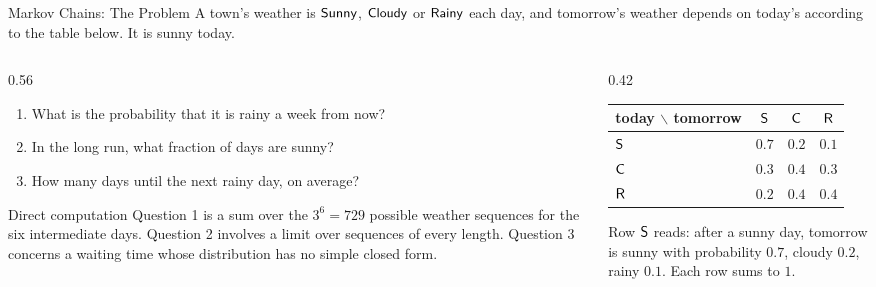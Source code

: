 \begin{frame}{Markov Chains: The Problem}
  \label{fr:mcprob}
  \small
  A town's weather is $\mathsf{Sunny}$, $\mathsf{Cloudy}$ or $\mathsf{Rainy}$ each day, and tomorrow's weather depends on today's according to the table below. It is sunny today.
  \begin{columns}[T]
    \begin{column}{0.56\textwidth}
      \begin{enumerate}
        \item What is the probability that it is rainy a week from now?
        \item In the long run, what fraction of days are sunny?
        \item How many days until the next rainy day, on average?
      \end{enumerate}
      \begin{block}{Direct computation}
        Question 1 is a sum over the $3^6=729$ possible weather sequences for the six intermediate days. Question 2 involves a limit over sequences of every length. Question 3 concerns a waiting time whose distribution has no simple closed form.
      \end{block}
    \end{column}
    \begin{column}{0.42\textwidth}
      \centering
      \renewcommand{\arraystretch}{1.3}
      \begin{tabular}{@{}l|ccc@{}}
        today $\backslash$ tomorrow & $\mathsf{S}$ & $\mathsf{C}$ & $\mathsf{R}$ \\ \hline
        $\mathsf{S}$ & $0.7$ & $0.2$ & $0.1$ \\
        $\mathsf{C}$ & $0.3$ & $0.4$ & $0.3$ \\
        $\mathsf{R}$ & $0.2$ & $0.4$ & $0.4$ \\
      \end{tabular}
      \par\medskip
      {\footnotesize Row $\mathsf{S}$ reads: after a sunny day, tomorrow is sunny with probability $0.7$, cloudy $0.2$, rainy $0.1$. Each row sums to $1$.}
    \end{column}
  \end{columns}
\end{frame}


